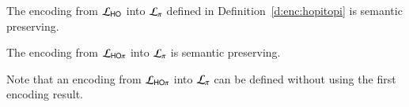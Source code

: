 \begin{theorem}
\label{f:enc:hotopi}
The encoding from $\mathcal{L}_{\mathsf{HO}}$ into $\mathcal{L}_{\pi}$ defined in 
Definition~\ref{d:enc:hopitopi} 
is semantic preserving. 
\end{theorem}

\begin{corollary}
The encoding from $\mathcal{L}_{\mathsf{HO}\pi}$ into $\mathcal{L}_{\pi}$ is semantic preserving. 
\end{corollary}

Note that an encoding from $\mathcal{L}_{\mathsf{HO}\pi}$ into $\mathcal{L}_{\pi}$
can be defined without using the first encoding result.  



